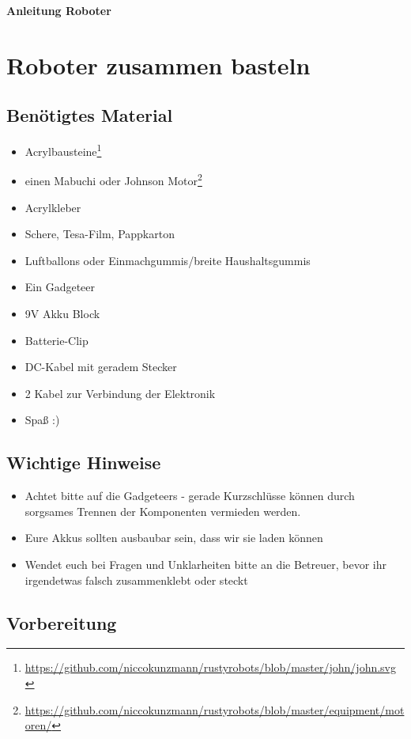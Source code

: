 \documentclass[12pt,a4paper]{article}
\begin{document}
\begin{center} 
	\Large{\textbf{Anleitung Roboter}}\\
\end{center}

\section{Roboter zusammen basteln}

\subsection{Benötigtes Material}
\begin{itemize}
\item Acrylbausteine\footnote{\url{https://github.com/niccokunzmann/rustyrobots/blob/master/john/john.svg}}
\item einen Mabuchi oder Johnson Motor\footnote{\url{https://github.com/niccokunzmann/rustyrobots/blob/master/equipment/motoren/}}
\item Acrylkleber
\item Schere, Tesa-Film, Pappkarton
\item Luftballons oder Einmachgummis/breite Haushaltsgummis
\item Ein Gadgeteer
\item 9V Akku Block
\item Batterie-Clip
\item DC-Kabel mit geradem Stecker
\item 2 Kabel zur Verbindung der Elektronik
\item Spaß :)
\end{itemize}

\subsection{Wichtige Hinweise}
\begin{itemize}
\item Achtet bitte auf die Gadgeteers - gerade Kurzschlüsse können durch sorgsames Trennen der Komponenten vermieden werden.
\item Eure Akkus sollten ausbaubar sein, dass wir sie laden können
\item Wendet euch bei Fragen und Unklarheiten bitte an die Betreuer, bevor ihr irgendetwas falsch zusammenklebt oder steckt
\end{itemize}
\subsection{Vorbereitung}
\end{document}
